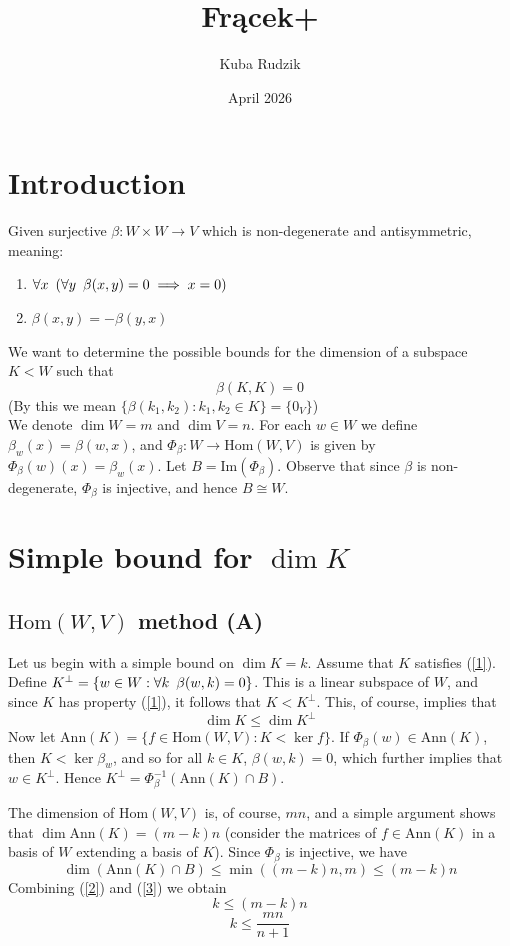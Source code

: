\documentclass{article}
\title{Frącek+}
\author{Kuba Rudzik}
\date{April 2026}
\newcommand{\Hquad}{\hspace{0.5em}}
\newcommand{\Hom}{\text{Hom}}
\newcommand{\IM}{\text{Im}}
\newcommand{\Ann}{\text{Ann}}
\begin{document}
\section{Introduction}

Given surjective $\beta :W \times W \to V$ which is non-degenerate and antisymmetric, meaning: 

\begin{enumerate}
    \item $\forall x \Hquad(\forall y \Hquad  \beta(x,y) = 0 \implies x= 0)$

    \item $\beta(x,y) =- \beta(y,x)$
\end{enumerate}
We want to determine the possible bounds for the dimension of a subspace $K < W$ such that
\begin{equation}
    \beta(K,K) = 0 \label{1} 
\end{equation}
(By this we mean $\{ \beta(k_1,k_2) : k_1,k_2 \in K\} = \{0_V\}$)
\\
We denote $\dim W = m$ and $\dim V = n$. For each $w \in W$ we define $\beta_w(x) = \beta(w,x)$, and $\Phi_\beta : W \to \Hom(W,V)$ is given by $\Phi_\beta(w)(x) = \beta_w(x)$.
Let $B = \IM(\Phi_\beta)$. Observe that since $\beta$ is non-degenerate, $\Phi_\beta$ is injective, and hence $B \cong W$.

\section{Simple bound for $\dim K$}

\subsection{$\Hom(W,V)$ method (A)}
Let us begin with a simple bound on $\dim K = k$. Assume that $K$ satisfies (\ref{1}). Define $K^{\bot} = \{w \in W : \forall k \Hquad \beta(w,k) = 0\}$. This is a linear subspace of $W$, and since $K$ has property (\ref{1}), it follows that $K < K^{\bot}$. This, of course, implies that 
\begin{equation}\dim K \leq \dim K^{\bot} \label{2}\end{equation}
Now let $\Ann(K) = \{f \in \Hom(W,V) : K < \ker f\}$. If $\Phi_\beta(w) \in \Ann(K)$, then $K < \ker \beta_w$, and so for all $k \in K$, $\beta(w,k) = 0$, which further implies that $w \in K^{\bot}$. Hence $K^\bot = \Phi_\beta^{-1}\left(\Ann(K) \cap B\right)$.

The dimension of $\Hom(W,V)$ is, of course, $mn$, and a simple argument shows that $\dim\Ann(K) = (m-k)n$ (consider the matrices of $f \in \Ann(K)$ in a basis of $W$ extending a basis of $K$). Since $\Phi_\beta$ is injective, we have
\begin{equation}\dim \left(\Ann(K) \cap B \right) \leq \min((m-k)n, m) \leq (m-k)n \label{3}\end{equation}
Combining (\ref{2}) and (\ref{3}) we obtain 
\[
    k \leq (m-k)n
\]
\begin{equation}
    k \leq \frac{mn}{n+1} \label{simplebound}
\end{equation}
\end{document}

